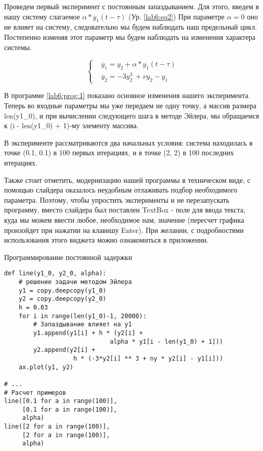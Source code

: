 Проведем первый эксперимент с постоянным запаздыванием.
Для этого, введем в нашу систему слагаемое $\alpha * y_1(t-\tau)$ (Ур. \ref{lab6:eq2})
При параметре $\alpha = 0$ оно не влияет на систему, следовательно мы будем
наблюдать наш предельный цикл. Постепенно изменяя этот параметр мы будем наблюдать
на изменения характера системы.

\begin{equation}\label{lab6:eq2}
\begin{cases}
    &\dot{y_1} = y_2 + \alpha * y_1(t-\tau)\\
    &\dot{y_2} = -3y_2^3\ + \nu y_2 - y_1
\end{cases}
\end{equation}

В программе \ref{lab6:prog:1} показано основное изменения нашего
эксперимента. Теперь во входные параметры мы уже передаем не
одну точку, а массив размера len(y1\_0), и при вычислении следующего
шага в методе Эйлера, мы обращаемся к (i - len(y1\_0) + 1)-му элементу массива.

В эксперименте рассматриваются два начальных условия: система находилась
в точке (0.1, 0.1) в 100 первых итерациях, и в точке (2, 2) в 100 последних итерациях.

Также стоит отметить, модернизацию нашей программы в техническом виде,
с помощью слайдера оказалось неудобным отлаживать подбор необходимого параметра.
Поэтому, чтобы упростить эксперименты и не перезапускать программу, вместо
слайдера был поставлен \textmd{TextBox} - поле для ввода текста, куда мы
можем ввести любое, необходимое нам, значение (пересчет графика произойдет при нажатии на клавишу
\textmd{Enter}). При желании, с подробностями использования этого виджета можно ознакомиться
в приложении.

\begin{program}
    \caption{Программирование постоянной задержки}
    \label{lab6:prog:1}
    \begin{verbatim}
def line(y1_0, y2_0, alpha):
    # решение задачи методом Эйлера
    y1 = copy.deepcopy(y1_0)
    y2 = copy.deepcopy(y2_0)
    h = 0.03
    for i in range(len(y1_0)-1, 20000):
        # Запаздывание влияет на y1
        y1.append(y1[i] + h * (y2[i] +
                             alpha * y1[i - len(y1_0) + 1]))
        y2.append(y2[i] +
                   h * (-3*y2[i] ** 3 + ny * y2[i] - y1[i]))
    ax.plot(y1, y2)

# ...
# Расчет примеров
line([0.1 for a in range(100)],
     [0.1 for a in range(100)],
     alpha)
line([2 for a in range(100)],
     [2 for a in range(100)],
     alpha)
    \end{verbatim}
\end{program}

